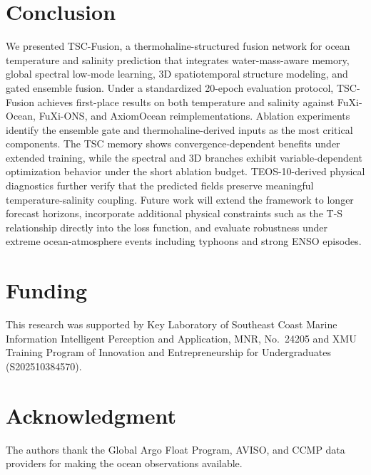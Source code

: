 \documentclass[conference]{IEEEtran}
\begin{document}
\section{Conclusion}

We presented TSC-Fusion, a thermohaline-structured fusion network for ocean temperature and salinity prediction that integrates water-mass-aware memory, global spectral low-mode learning, 3D spatiotemporal structure modeling, and gated ensemble fusion. Under a standardized 20-epoch evaluation protocol, TSC-Fusion achieves first-place results on both temperature and salinity against FuXi-Ocean, FuXi-ONS, and AxiomOcean reimplementations. Ablation experiments identify the ensemble gate and thermohaline-derived inputs as the most critical components. The TSC memory shows convergence-dependent benefits under extended training, while the spectral and 3D branches exhibit variable-dependent optimization behavior under the short ablation budget. TEOS-10-derived physical diagnostics further verify that the predicted fields preserve meaningful temperature-salinity coupling. Future work will extend the framework to longer forecast horizons, incorporate additional physical constraints such as the T-S relationship directly into the loss function, and evaluate robustness under extreme ocean-atmosphere events including typhoons and strong ENSO episodes.

\section*{Funding}
This research was supported by Key Laboratory of Southeast Coast Marine Information Intelligent Perception and Application, MNR, No.~24205 and XMU Training Program of Innovation and Entrepreneurship for Undergraduates (S202510384570).

\section*{Acknowledgment}
The authors thank the Global Argo Float Program, AVISO, and CCMP data providers for making the ocean observations available.



\end{document}
